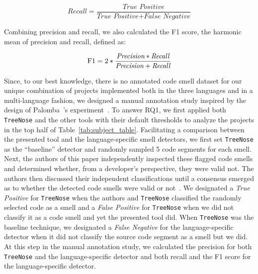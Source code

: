 \begin{equation}
    \textit{Recall} = \frac{\textit{True Positive}}{\textit{True Positive} + \textit{False Negative}}
\end{equation}

Combining precision and recall, we also calculated the F1 score, the harmonic
mean of precision and recall, defined as:

\begin{equation}
    \textnormal{F1} = 2 * \frac{\textit{Precision} * \textit{Recall}}{\textit{Precision} + \textit{Recall}}
\end{equation}



Since, to our best knowledge, there is no annotated code smell dataset for our
unique combination of projects implemented both in the three languages and in a
multi-language fashion, we designed a manual annotation study inspired by the
design of Palomba~\etal's experiment~\cite{Palomba2018}.
%
To answer RQ1, we first applied both \texttt{TreeNose} and the other tools with
their default thresholds to analyze the projects in the top half of
Table~\ref{tab:subject_table}.
%
Facilitating a comparison between the presented tool and the language-specific
smell detectors, we first set \texttt{TreeNose} as the ``baseline'' detector and
randomly sampled 5 code segments for each smell.
%
Next, the authors of this paper independently inspected these flagged code
smells and determined whether, from a developer's perspective, they were valid
not.
%
The authors then discussed their independent classifications until a consensus
emerged as to whether the detected code smells were valid or
not~\cite{Cruzes2011}.
%
We designated a \textit{True Positive} for \texttt{TreeNose} when the authors
and \texttt{TreeNose} classified the randomly selected code as a smell and a
\textit{False Positive} for \texttt{TreeNose} when we did not classify it as a
code smell and yet the presented tool did.
%
When \texttt{TreeNose} was the baseline technique, we designated a \textit{False
Negative} for the language-specific detector when it did not classify the source
code segment as a smell but we did.
%
At this step in the manual annotation study, we calculated the precision for
both \texttt{TreeNose} and the language-specific detector and both recall and
the F1 score for the language-specific detector.

